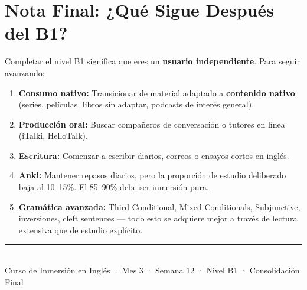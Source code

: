 \documentclass[12pt,a4paper]{article}
\begin{document}
\section*{Nota Final: ¿Qué Sigue Después del B1?}

\begin{cajaconsolidacion}
Completar el nivel B1 significa que eres un \textbf{usuario independiente}. Para seguir avanzando:

\begin{enumerate}[leftmargin=1.2cm]
  \item \textbf{Consumo nativo:} Transicionar de material adaptado a \textbf{contenido nativo} (series, películas, libros sin adaptar, podcasts de interés general).
  \item \textbf{Producción oral:} Buscar compañeros de conversación o tutores en línea (iTalki, HelloTalk).
  \item \textbf{Escritura:} Comenzar a escribir diarios, correos o ensayos cortos en inglés.
  \item \textbf{Anki:} Mantener repasos diarios, pero la proporción de estudio deliberado baja al 10--15\%. El 85--90\% debe ser inmersión pura.
  \item \textbf{Gramática avanzada:} Third Conditional, Mixed Conditionals, Subjunctive, inversiones, cleft sentences — todo esto se adquiere mejor a través de lectura extensiva que de estudio explícito.
\end{enumerate}
\end{cajaconsolidacion}

\vfill
\begin{center}
\rule{0.5\textwidth}{0.5pt}\\[0.3cm]
{\small\color{grissuave} Curso de Inmersión en Inglés · Mes 3 · Semana 12 · Nivel B1 · Consolidación Final}
\end{center}
\end{document}
